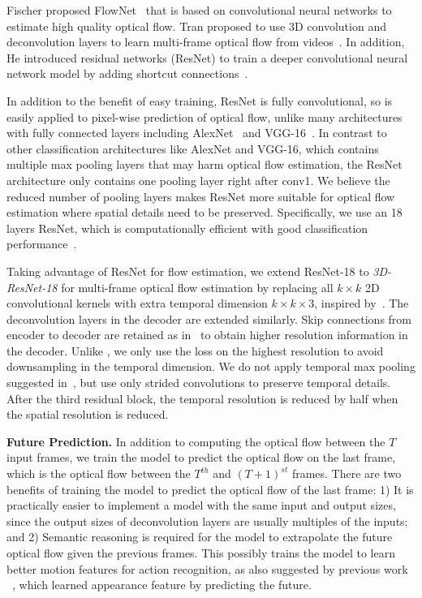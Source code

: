 \documentclass[10pt,twocolumn,letterpaper]{article}
\begin{document}
Fischer \etal proposed FlowNet~\cite{FischerDIHHGSCB15} that is based on convolutional neural networks to estimate high quality optical flow. Tran \etal proposed to use 3D convolution and deconvolution layers to learn multi-frame optical flow from videos~\cite{tranbftp16}.
In addition, He \etal introduced residual networks (ResNet) to train a deeper convolutional neural network model by adding shortcut connections~\cite{heZRS15}.

In addition to the benefit of easy training, ResNet is fully convolutional, so is easily applied to pixel-wise prediction of optical flow, unlike many architectures with fully connected layers including AlexNet~\cite{krizhevskySH12} and VGG-16~\cite{simonyanZ14}.
In contrast to other classification architectures like AlexNet and VGG-16, which contains multiple max pooling layers that may harm optical flow estimation, the ResNet architecture only contains one pooling layer right after conv1.
We believe the reduced number of pooling layers makes ResNet more suitable for optical flow estimation where spatial details need to be preserved.
Specifically, we use an 18 layers ResNet, which is computationally efficient with good classification performance~\cite{heZRS15}.


Taking advantage of ResNet for flow estimation, we extend ResNet-18 to \emph{3D-ResNet-18} for multi-frame optical flow estimation by replacing all $k\times k$ 2D convolutional kernels with extra temporal dimension $k \times k \times 3$, inspired by~\cite{tranbftp16}.
The deconvolution layers in the decoder are extended similarly.
Skip connections from encoder to decoder are retained as in~\cite{FischerDIHHGSCB15} to obtain higher resolution information in the decoder.
Unlike \cite{FischerDIHHGSCB15}, we only use the loss on the highest resolution to avoid downsampling in the temporal dimension. We do not apply temporal max pooling suggested in~\cite{tranBFTP15,tranbftp16}, but use only strided convolutions to preserve temporal details. After the third residual block, the temporal resolution is reduced by half when the spatial resolution is reduced.


\textbf{Future Prediction.}
In addition to computing the optical flow between the $T$ input frames, we train the model to predict the optical flow on the last frame, which is the optical flow between the $T^{th}$ and $(T+1)^{st}$ frames.
There are two benefits of training the model to predict the optical flow of the last frame:
1) It is practically easier to implement a model with the same input and output sizes, since the output sizes of deconvolution layers are usually multiples of the inputs; and
2) Semantic reasoning is required for the model to extrapolate the future optical flow given the previous frames. This possibly trains the model to learn better motion features for action recognition, as also suggested by previous work ~\cite{walker2016uncertain}, which learned appearance feature by predicting the future.
\end{document}
